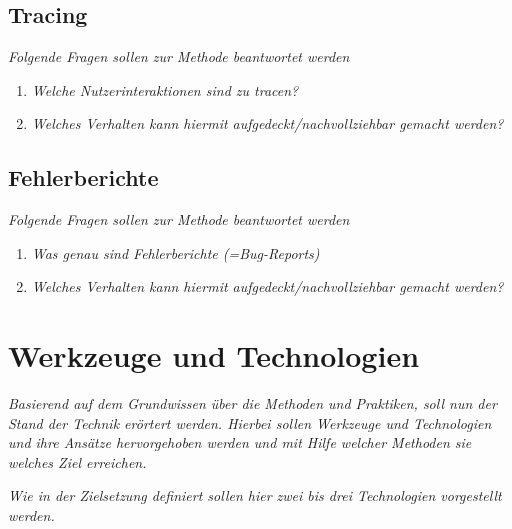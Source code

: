 \subsection{Tracing}

\textit{Folgende Fragen sollen zur Methode beantwortet werden}
\begin{enumerate}
	\item \textit{Welche Nutzerinteraktionen sind zu tracen?}
	\item \textit{Welches Verhalten kann hiermit aufgedeckt/nachvollziehbar gemacht werden?}
\end{enumerate}

\subsection{Fehlerberichte}

\textit{Folgende Fragen sollen zur Methode beantwortet werden}
\begin{enumerate}
	\item \textit{Was genau sind Fehlerberichte (=Bug-Reports) }
	\item \textit{Welches Verhalten kann hiermit aufgedeckt/nachvollziehbar gemacht werden?}
\end{enumerate}

\section{Werkzeuge und Technologien}

\textit{Basierend auf dem Grundwissen über die Methoden und Praktiken, soll nun der Stand der Technik erörtert werden. Hierbei sollen Werkzeuge und Technologien und ihre Ansätze hervorgehoben werden und mit Hilfe welcher Methoden sie welches Ziel erreichen.}

\textit{Wie in der Zielsetzung definiert sollen hier zwei bis drei Technologien vorgestellt werden.}